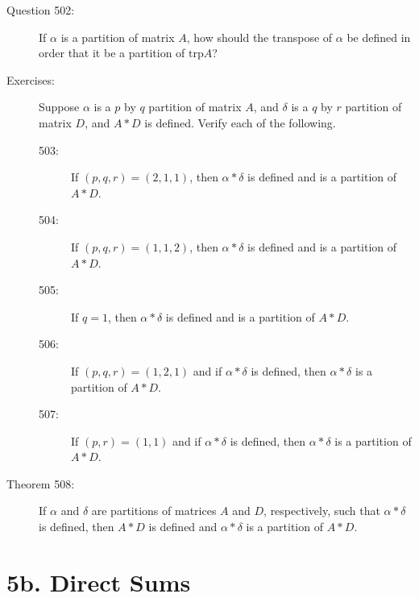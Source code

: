 \documentclass{article}
\begin{document}
\begin{description}
  \item[Question 502:] If $\alpha$ is a partition of matrix $A$, how should the transpose of $\alpha$ be defined in order that it be a partition of $\text{trp} A$?

  \item[Exercises:] Suppose $\alpha$ is a $p$ by $q$ partition of matrix $A$, and $\delta$ is a $q$ by $r$ partition of matrix $D$, and $A*D$ is defined. Verify each of the following.
    \begin{description}
      \item[503:] If $(p,q,r)=(2,1,1)$, then $\alpha*\delta$ is defined and is a partition of $A*D$.
      \item[504:] If $(p,q,r)=(1,1,2)$, then $\alpha*\delta$ is defined and is a partition of $A*D$.
      \item[505:] If $q=1$, then $\alpha*\delta$ is defined and is a partition of $A*D$.
      \item[506:] If $(p,q,r)=(1,2,1)$ and if $\alpha*\delta$ is defined, then $\alpha*\delta$ is a partition of $A*D$.
      \item[507:] If $(p,r)=(1,1)$ and if $\alpha*\delta$ is defined, then $\alpha*\delta$ is a partition of $A*D$.
    \end{description}

  \item[Theorem 508:] If $\alpha$ and $\delta$ are partitions of matrices $A$ and $D$, respectively, such that $\alpha*\delta$ is defined, then $A*D$ is defined and $\alpha*\delta$ is a partition of $A*D$.

\end{description}


\section*{5b. Direct Sums}
\end{document}
